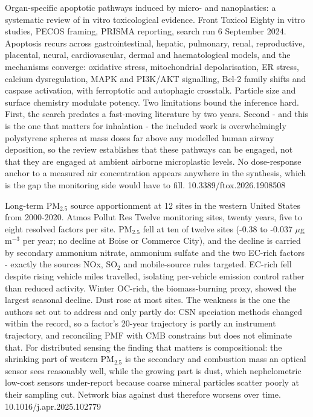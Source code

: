 \documentclass[10pt]{article}
\begin{document}

{Organ-specific apoptotic pathways induced by micro- and nanoplastics: a systematic review of in vitro toxicological evidence.}
{Front Toxicol}
{Eighty in vitro studies, PECOS framing, PRISMA reporting, search run 6 September 2024. Apoptosis recurs across gastrointestinal, hepatic, pulmonary, renal, reproductive, placental, neural, cardiovascular, dermal and haematological models, and the mechanisms converge: oxidative stress, mitochondrial depolarisation, ER stress, calcium dysregulation, MAPK and PI3K/AKT signalling, Bcl-2 family shifts and caspase activation, with ferroptotic and autophagic crosstalk. Particle size and surface chemistry modulate potency. Two limitations bound the inference hard. First, the search predates a fast-moving literature by two years. Second - and this is the one that matters for inhalation - the included work is overwhelmingly polystyrene spheres at mass doses far above any modelled human airway deposition, so the review establishes that these pathways can be engaged, not that they are engaged at ambient airborne microplastic levels. No dose-response anchor to a measured air concentration appears anywhere in the synthesis, which is the gap the monitoring side would have to fill.}
{10.3389/ftox.2026.1908508}


{Long-term PM$_{2.5}$ source apportionment at 12 sites in the western United States from 2000-2020.}
{Atmos Pollut Res}
{Twelve monitoring sites, twenty years, five to eight resolved factors per site. PM$_{2.5}$ fell at ten of twelve sites (-0.38 to -0.037 $\mu$g\,m$^{-3}$ per year; no decline at Boise or Commerce City), and the decline is carried by secondary ammonium nitrate, ammonium sulfate and the two EC-rich factors - exactly the sources NOx, SO$_2$ and mobile-source rules targeted. EC-rich fell despite rising vehicle miles travelled, isolating per-vehicle emission control rather than reduced activity. Winter OC-rich, the biomass-burning proxy, showed the largest seasonal decline. Dust rose at most sites. The weakness is the one the authors set out to address and only partly do: CSN speciation methods changed within the record, so a factor's 20-year trajectory is partly an instrument trajectory, and reconciling PMF with CMB constrains but does not eliminate that. For distributed sensing the finding that matters is compositional: the shrinking part of western PM$_{2.5}$ is the secondary and combustion mass an optical sensor sees reasonably well, while the growing part is dust, which nephelometric low-cost sensors under-report because coarse mineral particles scatter poorly at their sampling cut. Network bias against dust therefore worsens over time.}
{10.1016/j.apr.2025.102779}
\end{document}
